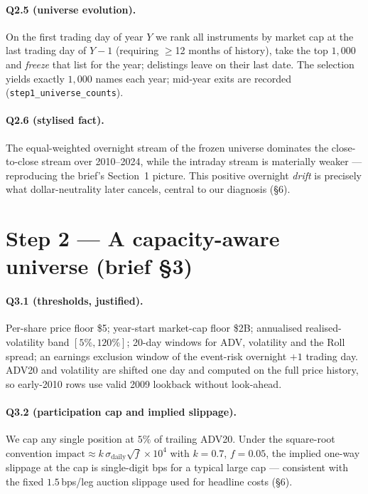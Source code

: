 \documentclass[11pt,a4paper]{article}
\newcommand{\code}[1]{\texttt{#1}}
\begin{document}
\paragraph{Q2.5 (universe evolution).} On the first trading day of year $Y$ we rank all instruments by market
cap at the last trading day of $Y{-}1$ (requiring $\ge$12 months of history), take the top $1{,}000$ and
\emph{freeze} that list for the year; delistings leave on their last date. The selection yields exactly
$1{,}000$ names each year; mid-year exits are recorded (\code{step1\_universe\_counts}).

\paragraph{Q2.6 (stylised fact).} The equal-weighted overnight stream of the frozen universe dominates the
close-to-close stream over 2010--2024, while the intraday stream is materially weaker --- reproducing the
brief's Section~1 picture. This positive overnight \emph{drift} is precisely what dollar-neutrality later
cancels, central to our diagnosis (\S6).

\section{Step 2 --- A capacity-aware universe (brief §3)}

\paragraph{Q3.1 (thresholds, justified).} Per-share price floor \$5; year-start market-cap floor \$2B;
annualised realised-volatility band $[5\%,120\%]$; 20-day windows for ADV, volatility and the Roll spread; an
earnings exclusion window of the event-risk overnight $+1$ trading day. ADV20 and volatility are shifted one
day and computed on the full price history, so early-2010 rows use valid 2009 lookback without look-ahead.

\paragraph{Q3.2 (participation cap and implied slippage).} We cap any single position at $5\%$ of trailing
ADV20. Under the square-root convention $\text{impact}\approx k\,\sigma_{\text{daily}}\sqrt{f}\times10^4$ with
$k=0.7$, $f=0.05$, the implied one-way slippage at the cap is single-digit bps for a typical large cap ---
consistent with the fixed $1.5$\,bps/leg auction slippage used for headline costs (\S6).
\end{document}

